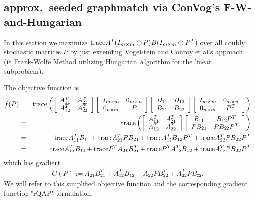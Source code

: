 \documentclass[12pt]{article}
\newcommand{\tr}{\textup{trace}}
\begin{document}
\subsection{approx.~seeded graphmatch via ConVog's F-W-and-Hungarian}

In this section we maximize
$\tr A^T(I_{m \times m}\oplus P)B(I_{m \times m}\oplus P^T)$
over all doubly stochastic matrices $P$
by just extending Vogelstein and Conroy et al's
approach (ie Frank-Wolfe Method utilizing  Hungarian Algorithm for the linear
subproblem).



The objective function is
\begin{eqnarray*}  f(P)  & =  &   \tr \left (
\left [  \begin{array}{cc}  A^T_{11} & A^T_{21} \\ A^T_{12} & A^T_{22}  \end{array} \right ]
\left [  \begin{array}{cc}  I_{m \times m} & 0_{m \times n}
\\ 0_{n \times m} & P  \end{array} \right ]
\left [  \begin{array}{cc}  B_{11} & B_{12} \\ B_{21} & B_{22}  \end{array} \right ]
\left [  \begin{array}{cc}  I_{m \times m} & 0_{m \times n}
\\ 0_{n \times m} & P^T  \end{array} \right ]
\right ) \\
& = & \tr \left (
\left [  \begin{array}{cc}  A^T_{11} & A^T_{21} \\ A^T_{12} & A^T_{22}  \end{array} \right ]
\left [  \begin{array}{cc}  B_{11} & B_{12}P^T \\ PB_{21} & PB_{22}P^T  \end{array} \right ]
\right )\\
& = & \tr A_{11}^TB_{11}+ \tr A_{21}^TPB_{21}+\tr A_{12}^TB_{12}P^T
+ \tr A_{22}^TPB_{22}P^T \\
& = &  \tr A_{11}^TB_{11}+ \tr P^T A_{21}B_{21}^T+\tr P^TA_{12}^TB_{12}
+ \tr A_{22}^TPB_{22}P^T
\end{eqnarray*}
which has gradient
\begin{eqnarray*}
G(P):=A_{21}B_{21}^T+A_{12}^TB_{12}+A_{22}PB_{22}^T+A_{22}^TPB_{22} .
\end{eqnarray*}
We will refer to this simplified objective function and the corresponding gradient function "rQAP" formulation.
\end{document}

